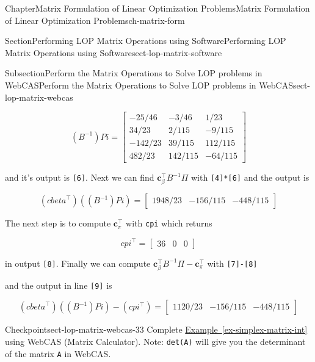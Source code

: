 \documentclass[oneside,10pt,]{book}
\newcommand{\xreffont}{\relax}
\newcommand{\mono}[1]{\texttt{#1}}
\numberwithin{equation}{section}
\newcommand{\amp}{&}
\begin{document}
\begin{chapterptx}{Chapter}{Matrix Formulation of Linear Optimization Problems}{}{Matrix Formulation of Linear Optimization Problems}{}{}{ch-matrix-form}
\begin{sectionptx}{Section}{Performing LOP Matrix Operations using Software}{}{Performing LOP Matrix Operations using Software}{}{}{sect-lop-matrix-software}
\begin{subsectionptx}{Subsection}{Perform the Matrix Operations to Solve LOP problems in WebCAS}{}{Perform the Matrix Operations to Solve LOP problems in WebCAS}{}{}{sect-lop-matrix-webcas}
\par
%
\begin{equation*}
(B^{-1})Pi = \begin{bmatrix} -25/46 \amp -3/46 \amp 1/23 \\ 34/23 \amp 2/115 \amp -9/115 \\ -142/23 \amp 39/115 \amp 112/115 \\ 482/23 \amp 142/115 \amp -64/115 \end{bmatrix}
\end{equation*}
%
\par
and it's output is \mono{[6]}. Next we can find \(\boldsymbol{c}_{\beta}^{\intercal}B^{-1}\Pi\) with \mono{[4]*[6]} and the output is%
\par
%
\begin{equation*}
({cbeta}^{\intercal})((B^{-1}) Pi) = \begin{bmatrix} 1948/23 \amp -156/115 \amp -448/115 \end{bmatrix}
\end{equation*}
%
\par
The next step is to compute \(\boldsymbol{c}_{\pi}^{\intercal}\) with \mono{cpi\textquotesingle{}} which returns%
\par
%
\begin{equation*}
cpi^{\intercal} = \begin{bmatrix} 36 \amp 0 \amp 0 \end{bmatrix}
\end{equation*}
%
\par
in output \mono{[8]}. Finally we can compute \(\boldsymbol{c}_{\beta}^{\intercal}B^{-1}\Pi - \boldsymbol{c}_{\pi}^{\intercal}\) with \mono{[7]-[8]}%
\par
and the output in line \mono{[9]} is%
\par
%
\begin{equation*}
({cbeta}^{\intercal})((B^{-1}) Pi) - (cpi^{\intercal})= \begin{bmatrix} 1120/23 \amp -156/115 \amp -448/115 \end{bmatrix}
\end{equation*}
%
\begin{inlineexercise}{Checkpoint}{}{sect-lop-matrix-webcas-33}%
Complete \hyperref[ex-simplex-matrix-int]{Example~{\xreffont\ref{ex-simplex-matrix-int}}} using WebCAS (Matrix Calculator). Note: \mono{det(A)} will give you the determinant of the matrix \mono{A} in WebCAS.%
\end{inlineexercise}%
\end{subsectionptx}

\end{sectionptx}
\end{chapterptx}
\end{document}
